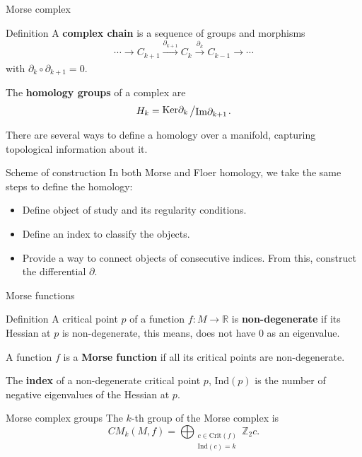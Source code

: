 \documentclass{beamer}
\newcommand{\con}[1]{\mathbb{#1}}
\newcommand{\R}{\con{R}}
\newcommand{\quocient}[2]{{\raisebox{.1em}{$#1$}\left/\raisebox{-.1em}{$#2$}\right.}}
\begin{document}
\begin{frame}{Morse complex}
	\begin{block}{Definition}
		A {\bf complex chain} is a sequence of groups and morphisms
		\[\cdots \rightarrow C_{k+1} \xrightarrow[]{\partial_{k+1}} C_k \xrightarrow[]{\partial_k} C_{k-1} \rightarrow \cdots\]
		with $\partial_k \circ \partial_{k+1} = 0$.

		The {\bf homology groups} of a complex are
		\[H_k = \quocient{\mathrm{Ker} \partial_k}{\mathrm{Im} \partial_{k+1}} .\]
	\end{block}

	There are several ways to define a homology over a manifold, capturing topological information about it.
\end{frame}

\begin{frame}{Scheme of construction}
	In both Morse and Floer homology, we take the same steps to define the homology:
	\begin{itemize}
		\item Define object of study and its regularity conditions.
		\item Define an index to classify the objects.
		\item Provide a way to connect objects of consecutive indices. From this, construct the differential $\partial$.
	\end{itemize}
\end{frame}

\begin{frame}{Morse functions}
	\begin{block}{Definition}
		A critical point $p$ of a function $f : M \rightarrow \R$ is {\bf non-degenerate} if its Hessian at $p$ is non-degenerate, this means, does not have $0$ as an eigenvalue.

		A function $f$ is a {\bf Morse function} if all its critical points are non-degenerate.

		The {\bf index} of a non-degenerate critical point $p$, $\mathrm{Ind}(p)$ is the number of negative eigenvalues of the Hessian at $p$.
	\end{block}

	\begin{block}{Morse complex groups}
		The $k$-th group of the Morse complex is
		\[CM_k(M,f) = \bigoplus_{\substack{c \in \mathrm{Crit}(f) \\ \mathrm{Ind}(c) = k}} \con{Z}_2 c .\]
	\end{block}
\end{frame}
\end{document}
